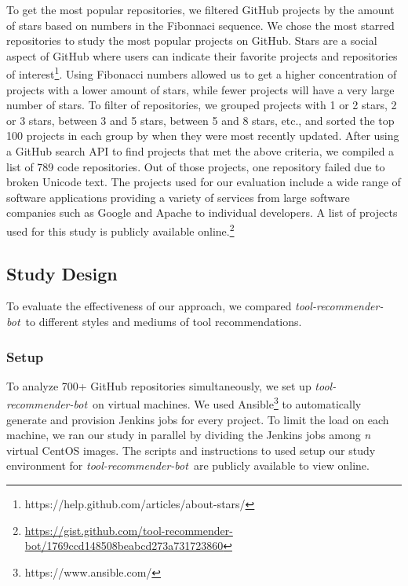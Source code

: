 \documentclass[sigconf,review,anonymous]{acmart}
\newcommand{\tool}{\textsl{tool-recommender-bot}}
\begin{document}
To get the most popular repositories, we filtered GitHub projects by the amount of stars based on numbers in the Fibonnaci sequence. We chose the most starred repositories to study the most popular projects on GitHub. Stars are a social aspect of GitHub where users can indicate their favorite projects and repositories of interest\footnote{https://help.github.com/articles/about-stars/}. Using Fibonacci numbers allowed us to get a higher concentration of projects with a lower amount of stars, while fewer projects will have a very large number of stars. To filter of repositories, we grouped projects with 1 or 2 stars, 2 or 3 stars, between 3 and 5 stars, between 5 and 8 stars, etc., and sorted the top 100 projects in each group by when they were most recently updated. After using a GitHub search API to find projects that met the above criteria, we compiled a list of 789 code repositories. Out of those projects, one repository failed due to broken Unicode text. %
The projects used for our evaluation include a wide range of software applications providing a variety of services from large software companies such as Google and Apache to individual developers. A list of projects used for this study is publicly available online.\footnote{\url{https://gist.github.com/tool-recommender-bot/1769ccd148508beabcd273a731723860}}

\subsection{Study Design}

To evaluate the effectiveness of our approach, we compared \tool~to different styles and mediums of tool recommendations.

\subsubsection{Setup}

To analyze 700+ GitHub repositories simultaneously, we set up \tool~on virtual machines. We used Ansible\footnote{https://www.ansible.com/} to automatically generate and provision Jenkins jobs for every project. To limit the load on each machine, we ran our study in parallel by dividing the Jenkins jobs among \textit{n} virtual CentOS images. The scripts and instructions to used setup our study environment for \tool~are publicly available to view online.
\end{document}
